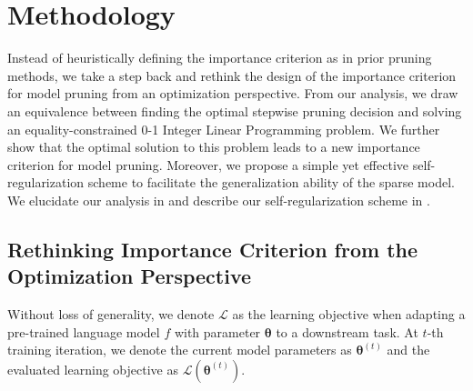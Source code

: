 \section{Methodology}
Instead of heuristically defining the importance criterion as in prior pruning methods, we take a step back and rethink the design of the importance criterion for model pruning from an optimization perspective. From our analysis, we draw an equivalence between finding the optimal stepwise pruning decision and solving an equality-constrained 0-1 Integer Linear Programming problem. We further show that the optimal solution to this problem leads to a new importance criterion for model pruning. Moreover, we propose a simple yet effective self-regularization scheme to facilitate the generalization ability of the sparse model. We elucidate our analysis in  and describe our self-regularization scheme in .
\subsection{Rethinking Importance Criterion from the Optimization Perspective}
\label{sec:analysis}
Without loss of generality, we denote $\mathcal{L}$ as the learning objective when adapting a pre-trained language model $f$ with parameter $\bm{\theta}$ to a downstream task. At $t$-th training iteration, we denote the current model parameters as $\bm{\theta}^{(t)}$ and the evaluated learning objective as $\mathcal{L}(\bm{\theta}^{(t)})$.

